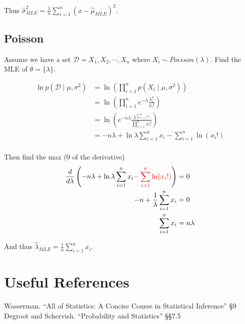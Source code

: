Thus $\displaystyle\hat\sigma^2_{MLE} = \frac{1}{n}\sum_{i=1}^n (x-\hat\mu_{MLE})^2$. 

\subsection{Poisson}
Assume we have a set $\mathcal{D} = X_1, X_2, \cdots, X_n$ 
where $X_i \sim Poisson(\lambda)$.
Find the MLE of $\theta = \{\lambda\}$.

\begin{align*}
\ln p(\mathcal{D}\mid\mu,\sigma^2) & = \ln\left(\prod_{i=1}^n p(X_i\mid\mu,\sigma^2)\right)\\
						& = \ln \left(\prod_{i=1}^n e^{-\lambda}\frac{\lambda^x_i}{x_i!}\right)\\
						& = \ln \left(e^{-n\lambda}\frac{\lambda^{\sum_{i=1}^n x_i}}{ \prod_{i=1}^nx_i!}\right)\\
						& = -n\lambda + \ln \lambda \sum_{i=1}^n x_i -\sum_{i=1}^n\ln(x_i!)\\
\end{align*}

Then find the max (0 of the derivative)
\begin{align*}
\frac{d}{d\lambda} \left( -n\lambda + \ln \lambda \sum_{i=1}^n x_i{\color{red} -\sum_{i=1}^n\ln(x_i!)}\right) &= 0\\
-n + \frac{1}{\lambda}\sum_{i=1}^n x_i & =0\\
\sum_{i=1}^n x_i & =n\lambda\\
\end{align*}

And thus $\displaystyle\hat\lambda_{MLE} = \frac{1}{n}\sum_{i=1}^n x_i$.

\section*{Useful References}
Wasserman. ``All of Statistics: A Concise Course in Statistical Inference'' \S9
Degroot and Schervish. ``Probability and Statistics''  \S\S7.5


